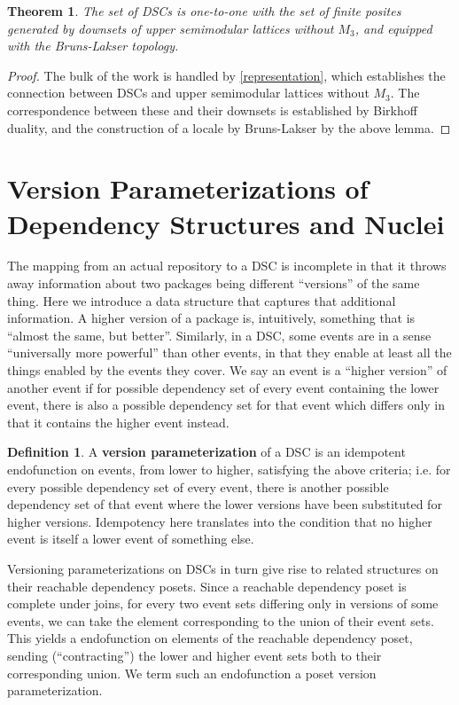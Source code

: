 \documentclass[hoptionsi,review,screen,format=sigconf]{acmart}
\newtheorem{theorem}{Theorem}[section]
\theoremstyle{definition}
\newtheorem{definition}{Definition}[section]
\begin{document}
\begin{theorem}
The set of DSCs is one-to-one with the set of finite posites generated by downsets of upper semimodular lattices without \(M_3\), and equipped with the Bruns-Lakser topology.
\end{theorem}
\begin{proof}
The bulk of the work is handled by \ref{representation}, which establishes the connection between DSCs and upper semimodular lattices without \(M_3\). The correspondence between these and their downsets is established by Birkhoff duality, and the construction of a locale by Bruns-Lakser by the above lemma.
\end{proof}

\section{Version Parameterizations of Dependency Structures and Nuclei}

The mapping from an actual repository to a DSC is incomplete in that it throws away information about two packages being different ``versions'' of the same thing. Here we introduce a data structure that captures that additional information. A higher version of a package is, intuitively, something that is ``almost the same, but better''. Similarly, in a DSC, some events are in a sense ``universally more powerful'' than other events, in that they enable at least all the things enabled by the events they cover. We say an event is a ``higher version'' of another event if for possible dependency set of every event containing the lower event, there is also a possible dependency set for that event which differs only in that it contains the higher event instead.

\begin{definition}
A \textbf{version parameterization} of a DSC is an idempotent endofunction on events, from lower to higher, satisfying the above criteria; i.e. for every possible dependency set of every event, there is another possible dependency set of that event where the lower versions have been substituted for higher versions. Idempotency here translates into the condition that no higher event is itself a lower event of something else.
\end{definition}

Versioning parameterizations on DSCs in turn give rise to related structures on their reachable dependency posets. Since a reachable dependency poset is complete under joins, for every two event sets differing only in versions of some events, we can take the element corresponding to the union of their event sets. This yields a  endofunction on elements of the reachable dependency poset, sending (``contracting'') the lower and higher event sets both to their corresponding union. We term such an endofunction a poset version parameterization.
\end{document}
